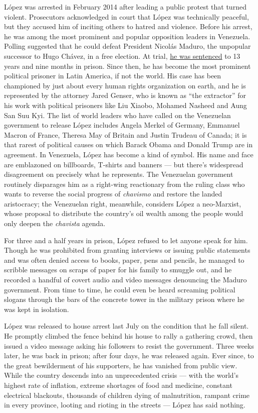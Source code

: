 López was arrested in February 2014 after leading a public protest that
turned violent. Prosecutors acknowledged in court that López was
technically peaceful, but they accused him of inciting others to hatred
and violence. Before his arrest, he was among the most prominent and
popular opposition leaders in Venezuela. Polling suggested that he could
defeat President Nicolás Maduro, the unpopular successor to Hugo Chávez,
in a free election. At trial,
\href{https://www.nytimes3xbfgragh.onion/2015/09/11/world/americas/venezuelan-opposition-leader-is-sentenced-to-prison-over-a-protest.html}{he
was sentenced} to 13 years and nine months in prison. Since then, he has
become the most prominent political prisoner in Latin America, if not
the world. His case has been championed by just about every human rights
organization on earth, and he is represented by the attorney Jared
Genser, who is known as ``the extractor'' for his work with political
prisoners like Liu Xiaobo, Mohamed Nasheed and Aung San Suu Kyi. The
list of world leaders who have called on the Venezuelan government to
release López includes Angela Merkel of Germany, Emmanuel Macron of
France, Theresa May of Britain and Justin Trudeau of Canada; it is that
rarest of political causes on which Barack Obama and Donald Trump are in
agreement. In Venezuela, López has become a kind of symbol. His name and
face are emblazoned on billboards, T-shirts and banners --- but there's
widespread disagreement on precisely what he represents. The Venezuelan
government routinely disparages him as a right-wing reactionary from the
ruling class who wants to reverse the social progress of \emph{chavismo}
and restore the landed aristocracy; the Venezuelan right, meanwhile,
considers López a neo-Marxist, whose proposal to distribute the
country's oil wealth among the people would only deepen the
\emph{chavista} agenda.

For three and a half years in prison, López refused to let anyone speak
for him. Though he was prohibited from granting interviews or issuing
public statements and was often denied access to books, paper, pens and
pencils, he managed to scribble messages on scraps of paper for his
family to smuggle out, and he recorded a handful of covert audio and
video messages denouncing the Maduro government. From time to time, he
could even be heard screaming political slogans through the bars of the
concrete tower in the military prison where he was kept in isolation.

López was released to house arrest last July on the condition that he
fall silent. He promptly climbed the fence behind his house to rally a
gathering crowd, then issued a video message asking his followers to
resist the government. Three weeks later, he was back in prison; after
four days, he was released again. Ever since, to the great bewilderment
of his supporters, he has vanished from public view. While the country
descends into an unprecedented crisis --- with the world's highest rate
of inflation, extreme shortages of food and medicine, constant
electrical blackouts, thousands of children dying of malnutrition,
rampant crime in every province, looting and rioting in the streets ---
López has said nothing.

